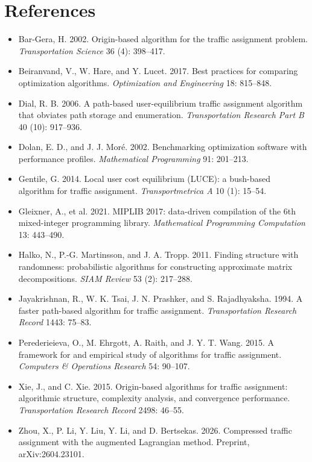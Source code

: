 \documentclass[11pt]{article}
\begin{document}
\section*{References}
\begin{itemize}
\item[] Bar-Gera, H. 2002. Origin-based algorithm for the traffic
assignment problem. \textit{Transportation Science} 36 (4): 398--417.
\item[] Beiranvand, V., W. Hare, and Y. Lucet. 2017. Best practices for
comparing optimization algorithms. \textit{Optimization and Engineering}
18: 815--848.
\item[] Dial, R. B. 2006. A path-based user-equilibrium traffic assignment
algorithm that obviates path storage and enumeration.
\textit{Transportation Research Part B} 40 (10): 917--936.
\item[] Dolan, E. D., and J. J. Mor\'e. 2002. Benchmarking optimization
software with performance profiles. \textit{Mathematical Programming} 91:
201--213.
\item[] Gentile, G. 2014. Local user cost equilibrium (LUCE): a bush-based
algorithm for traffic assignment. \textit{Transportmetrica A} 10 (1):
15--54.
\item[] Gleixner, A., et al. 2021. MIPLIB 2017: data-driven compilation of
the 6th mixed-integer programming library. \textit{Mathematical Programming
Computation} 13: 443--490.
\item[] Halko, N., P.-G. Martinsson, and J. A. Tropp. 2011. Finding
structure with randomness: probabilistic algorithms for constructing
approximate matrix decompositions. \textit{SIAM Review} 53 (2): 217--288.
\item[] Jayakrishnan, R., W. K. Tsai, J. N. Prashker, and S. Rajadhyaksha.
1994. A faster path-based algorithm for traffic assignment.
\textit{Transportation Research Record} 1443: 75--83.
\item[] Perederieieva, O., M. Ehrgott, A. Raith, and J. Y. T. Wang. 2015.
A framework for and empirical study of algorithms for traffic assignment.
\textit{Computers \& Operations Research} 54: 90--107.
\item[] Xie, J., and C. Xie. 2015. Origin-based algorithms for traffic
assignment: algorithmic structure, complexity analysis, and convergence
performance. \textit{Transportation Research Record} 2498: 46--55.
\item[] Zhou, X., P. Li, Y. Liu, Y. Li, and D. Bertsekas. 2026. Compressed
traffic assignment with the augmented Lagrangian method. Preprint,
arXiv:2604.23101.
\end{itemize}
\end{document}
